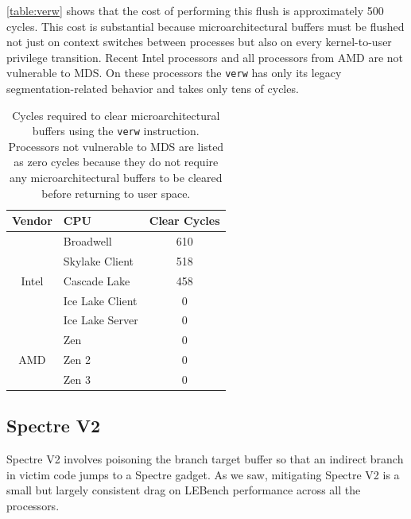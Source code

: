 \autoref{table:verw} shows that the cost of performing this flush is approximately 500 cycles.
This cost is substantial because microarchitectural buffers must be flushed not
just on context switches between processes but also on every kernel-to-user privilege transition.
Recent Intel processors and all processors from AMD are not vulnerable to MDS.
On these processors the \texttt{verw} has only its legacy segmentation-related behavior and takes only tens of cycles.

\begin{table}[h]
  \begin{center}
  \begin{tabular}{clc}
      \textbf{Vendor} & \textbf{CPU} & \textbf{Clear Cycles} \\ \hline 
      \multirow{5}{*}{Intel} & Broadwell             & 610 \\
                             & Skylake Client        & 518 \\
                             & Cascade Lake          & 458 \\
                             & Ice Lake Client       & 0 \\
                             & Ice Lake Server       & 0 \\ \hline
      \multirow{3}{*}{AMD}   & Zen                   & 0 \\
                             & Zen 2                 & 0 \\
                             & Zen 3                 & 0 \\ \hline
  \end{tabular}
  \end{center}
  \caption{Cycles required to clear microarchitectural buffers using the
    \texttt{verw} instruction. Processors not vulnerable to MDS are listed as
    zero cycles because they do not require any microarchitectural buffers to be cleared before returning to user space. }
  \label{table:verw}
\end{table}

\subsection{Spectre V2}

Spectre V2 involves poisoning the branch target buffer so that an indirect branch in victim code jumps to a Spectre gadget.
As we saw, mitigating Spectre V2 is a small but largely consistent drag on LEBench performance across all the processors.

